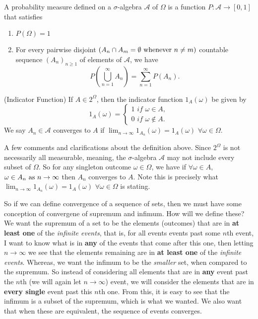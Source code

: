 \documentclass[../main.tex]{subfiles}
\begin{document}
\begin{definition}\label{def:probability}
A probability measure defined on a $ \sigma $-algebra $\mathcal{A}$ of $\Omega$ is a function $ P: \mathcal{A} \to [0,1] $ that satisfies 
\begin{enumerate}
    \item $P(\Omega)=1$
    \item For every pairwise disjoint $ (A_n \cap A_m = \emptyset \textnormal{ whenever } n \neq m) $ countable sequence $ (A_n)_{n \geq 1} $ of elements of $\mathcal{A}$, we have 
    \[
    P\left(\bigcup^\infty_{n=1}{A_n}\right) = \sum^\infty_{n=1}{P(A_n)}.
    \]
\end{enumerate}
\end{definition}







\begin{definition}(Indicator Function)\label{def:indicator function}
If $A \in 2^\Omega$, then the indicator function $1_A(\omega)$ be given by
\[
1_A(\omega) = 
\begin{cases}
    1 \textit{ if } \omega \in A,\\
    0 \textit{ if } \omega \notin A.
\end{cases}
\]
We say $A_n \in \mathcal{A}$ converges to $A$ if $\lim_{n\to\infty}{1_{A_n}(\omega)} = 1_A(\omega)$ $\forall \omega \in \Omega$.
\end{definition}
\begin{remark}
A few comments and clarifications about the definition above. Since $2^\Omega$
is not necessarily all measurable, meaning, the $\sigma$-algebra $\mathcal{A}$
may not include every subset of $\Omega$. So for any singleton outcome $\omega \in \Omega$, 
we have if $\forall \omega \in A$, $\omega \in A_n \textnormal{ as } n \to \infty$ then $A_n$ converges to $A$.
Note this is precisely what $\lim_{n\to\infty}{1_{A_n}(\omega)} = 1_A(\omega)$ $\forall \omega \in \Omega$ is stating.
\end{remark}

\begin{remark}
So if we can define convergence of a sequence of sets, then we must have some conception of 
convergene of supremum and infimum. How will we define these? We want the supremum of a set to be 
the elements (outcomes) that are in \textbf{at least one} of the \textit{infinite events}, that is, for all events events past some $n$th event,
I want to know what is in \textbf{any} of the events that come after this one, then letting $n\to \infty$ we see that
the elements remaining are in \textbf{at least one} of the \textit{infinite events}. Whereas, we want the infimum to be the \textit{smaller} 
set, when compared to the supremum. So instead of considering all elements that are in \textbf{any} event past the $n$th (we will again let $n\to\infty$) event, 
we will consider the elements that are in \textbf{every single} event past this $n$th one. From this, it is easy to see that the infimum
is a subset of the supremum, which is what we wanted. We also want that when these are equivalent, the sequence of events converges.
\end{remark}
\end{document}
